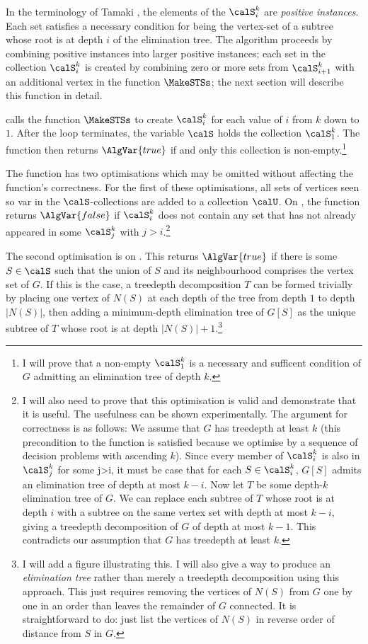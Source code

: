 In the terminology of Tamaki \cite{DBLP:journals/jco/Tamaki19}, the elements of the
$\calS_i^k$ are \emph{positive instances}. Each set satisfies a necessary condition for
being the vertex-set of a subtree whose root is at depth $i$ of the elimination tree.
The algorithm proceeds by combining positive instances into larger positive instances; each set in
the collection $\calS_i^k$ is created by combining zero or more sets from $\calS_{i+1}^k$ with an
additional vertex in the function $\MakeSTSs$; the next section will describe this function in detail.

 calls the function
$\MakeSTSs$ to create $\calS_i^k$ for each value of $i$ from $k$ down to $1$.  After the loop terminates,
the variable $\calS$ holds the collection $\calS_1^k$.  The function then returns $\AlgVar{true}$ if and only
this collection is non-empty.\footnote{I will prove that a non-empty $\calS_1^k$ is a necessary and sufficent
condition of $G$ admitting an elimination tree of depth $k$.}

The function has two optimisations which may be omitted without affecting the function's correctness.  For
the first of these optimisations, all sets of vertices seen so var in the $\calS$-collections are added to
a collection $\calU$.  On , the function returns $\AlgVar{false}$ if $\calS_i^k$ does
not contain any set that has not already appeared in some $\calS_j^k$ with $j>i$.\footnote{I will also
need to prove that this optimisation is valid and demonstrate that it is useful.  The usefulness
can be shown experimentally. The argument for correctness
is as follows: We assume that $G$ has treedepth at least $k$ (this precondition to the function
is satisfied because we optimise by a sequence of decision problems with ascending $k$).
Since every member of $\calS_i^k$
is also in $\calS_j^k$ for some j>i, it must be case that for each $S \in \calS_i^k$, $G[S]$ admits
an elimination tree of depth at most $k-i$.  Now let $T$ be some depth-$k$ elimination tree of $G$.
We can replace each subtree of $T$ whose root is at depth $i$ with a subtree on the same vertex set
with depth at most $k-i$, giving a treedepth decomposition of $G$ of depth at most $k-1$.
This contradicts our assumption that $G$ has treedepth at least $k$.}

The second optimisation is on .  This returns $\AlgVar{true}$ if
there is some $S \in \calS$ such that the union of $S$ and its neighbourhood comprises the vertex set
of $G$.  If this is the case, a treedepth decomposition $T$ can be formed trivially by placing one
vertex of $N(S)$ at each depth of the tree from depth $1$ to depth $|N(S)|$, then adding a minimum-depth
elimination tree of $G[S]$ as the unique subtree of $T$ whose root is at depth $|N(S)| + 1$.\footnote{I
will add a figure illustrating this.  I will also give a way to produce an \emph{elimination tree} rather
than merely a treedepth decomposition using this approach.  This just requires removing the vertices of $N(S)$
from $G$ one by one in an order than leaves the remainder of $G$ connected.  It is straightforward to do:
just list the vertices of $N(S)$ in reverse order of distance from $S$ in $G$.}

